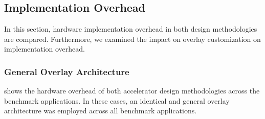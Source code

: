 
\subsection{Implementation Overhead} \label{subsec:impl}
In this section, hardware implementation overhead in both design methodologies are compared. Furthermore, we examined the impact on overlay customization on implementation overhead.

\subsubsection{General Overlay Architecture}
 shows the hardware overhead of both accelerator design methodologies across the benchmark applications.
In these cases, an identical and general overlay architecture was employed across all benchmark applications.

